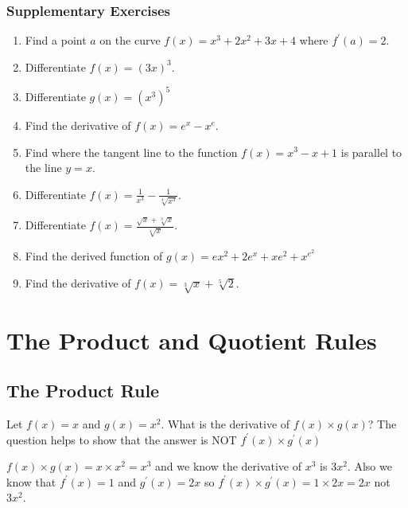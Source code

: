 \subsubsection{Supplementary Exercises}
\begin{enumerate}
\item Find a point $a$ on the curve $f (x) =x^{3} +2 x^{2} +3 x +4$ where $f^{ \prime } (a) =2$. 

\item Differentiate $f (x) =\left (3 x\right )^{3}$. 

\item Differentiate $g (x) =\left (x^{3}\right )^{5}$ 

\item Find the derivative of $f (x) =e^{x} -x^{e}$. 

\item Find where the tangent line to the function $f (x) =x^{3} -x +1$ is parallel to the line $y =x$. 

\item Differentiate $f (x) =\frac{1}{x^{3}} -\frac{1}{\sqrt[{4}]{x^{3}}}$. 

\item Differentiate $f (x) =\frac{\sqrt{x} +\sqrt[{3}]{x}}{\sqrt[{4}]{x}}$. 

\item Find the derived function of $g (x) =e x^{2} +2 e^{x} +x e^{2} +x^{e^{2}}$ 

\item Find the derivative of $f (x) =\sqrt[{3}]{x} +\sqrt[{5}]{2}$. \end{enumerate}


\section{The Product and Quotient Rules}


\subsection{The Product Rule}
Let $f (x) =x$ and $g (x) =x^{2}$. What is the derivative of $f (x) \times g (x)$? The question helps to show that the answer is NOT $f^{ \prime } (x) \times g^{ \prime } (x)$ 

$f (x) \times g (x) =x \times x^{2} =x^{3}$ and we know the derivative of $x^{3}$ is $3 x^{2}$. Also we know that $f^{ \prime } (x) =1$ and $g^{ \prime } (x) =2 x$ so $f^{ \prime } (x) \times g^{ \prime } (x) =1 \times 2 x =2 x$ not $3 x^{2}$. 

